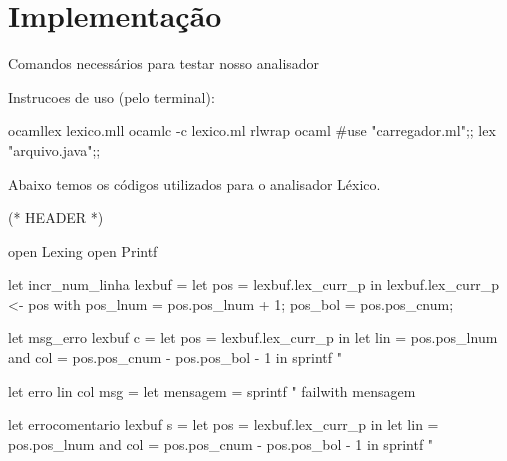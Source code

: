 \documentclass[12pt,a4paper,twoside]{report}
\begin{document}
\section{Implementação}
Comandos necessários para testar nosso analisador
\begin{terminal}
 Instrucoes de uso (pelo terminal):

   ocamllex lexico.mll
   ocamlc -c lexico.ml
   rlwrap ocaml
   #use "carregador.ml";;
   lex "arquivo.java";;

\end{terminal}
Abaixo temos os códigos utilizados para o analisador Léxico.
\begin{terminal}
{ (* HEADER *)

open Lexing
open Printf

let incr_num_linha lexbuf =
  let pos = lexbuf.lex_curr_p in
  lexbuf.lex_curr_p <- { pos with
                         pos_lnum = pos.pos_lnum + 1;
                         pos_bol = pos.pos_cnum;
                       }

let msg_erro lexbuf c =
  let pos = lexbuf.lex_curr_p in
  let lin = pos.pos_lnum
  and col = pos.pos_cnum - pos.pos_bol - 1 in
  sprintf "%

let erro lin col msg =
  let mensagem = sprintf "%
     failwith mensagem

let errocomentario lexbuf s =
  let pos = lexbuf.lex_curr_p in
  let lin = pos.pos_lnum
  and col = pos.pos_cnum - pos.pos_bol - 1 in
  sprintf "%

}
\end{terminal}
\end{document}
